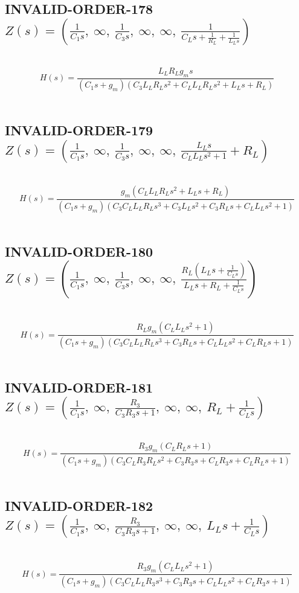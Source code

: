 \documentclass{article}
\begin{document}
\subsection{INVALID-ORDER-178 $Z(s) = \left( \frac{1}{C_{1} s}, \  \infty, \  \frac{1}{C_{3} s}, \  \infty, \  \infty, \  \frac{1}{C_{L} s + \frac{1}{R_{L}} + \frac{1}{L_{L} s}}\right)$ } \ 
\textbf{\[H(s) = \frac{L_{L} R_{L} g_{m} s}{\left(C_{1} s + g_{m}\right) \left(C_{3} L_{L} R_{L} s^{2} + C_{L} L_{L} R_{L} s^{2} + L_{L} s + R_{L}\right)}\] } \ 
\subsection{INVALID-ORDER-179 $Z(s) = \left( \frac{1}{C_{1} s}, \  \infty, \  \frac{1}{C_{3} s}, \  \infty, \  \infty, \  \frac{L_{L} s}{C_{L} L_{L} s^{2} + 1} + R_{L}\right)$ } \ 
\textbf{\[H(s) = \frac{g_{m} \left(C_{L} L_{L} R_{L} s^{2} + L_{L} s + R_{L}\right)}{\left(C_{1} s + g_{m}\right) \left(C_{3} C_{L} L_{L} R_{L} s^{3} + C_{3} L_{L} s^{2} + C_{3} R_{L} s + C_{L} L_{L} s^{2} + 1\right)}\] } \ 
\subsection{INVALID-ORDER-180 $Z(s) = \left( \frac{1}{C_{1} s}, \  \infty, \  \frac{1}{C_{3} s}, \  \infty, \  \infty, \  \frac{R_{L} \left(L_{L} s + \frac{1}{C_{L} s}\right)}{L_{L} s + R_{L} + \frac{1}{C_{L} s}}\right)$ } \ 
\textbf{\[H(s) = \frac{R_{L} g_{m} \left(C_{L} L_{L} s^{2} + 1\right)}{\left(C_{1} s + g_{m}\right) \left(C_{3} C_{L} L_{L} R_{L} s^{3} + C_{3} R_{L} s + C_{L} L_{L} s^{2} + C_{L} R_{L} s + 1\right)}\] } \ 
\subsection{INVALID-ORDER-181 $Z(s) = \left( \frac{1}{C_{1} s}, \  \infty, \  \frac{R_{3}}{C_{3} R_{3} s + 1}, \  \infty, \  \infty, \  R_{L} + \frac{1}{C_{L} s}\right)$ } \ 
\textbf{\[H(s) = \frac{R_{3} g_{m} \left(C_{L} R_{L} s + 1\right)}{\left(C_{1} s + g_{m}\right) \left(C_{3} C_{L} R_{3} R_{L} s^{2} + C_{3} R_{3} s + C_{L} R_{3} s + C_{L} R_{L} s + 1\right)}\] } \ 
\subsection{INVALID-ORDER-182 $Z(s) = \left( \frac{1}{C_{1} s}, \  \infty, \  \frac{R_{3}}{C_{3} R_{3} s + 1}, \  \infty, \  \infty, \  L_{L} s + \frac{1}{C_{L} s}\right)$ } \ 
\textbf{\[H(s) = \frac{R_{3} g_{m} \left(C_{L} L_{L} s^{2} + 1\right)}{\left(C_{1} s + g_{m}\right) \left(C_{3} C_{L} L_{L} R_{3} s^{3} + C_{3} R_{3} s + C_{L} L_{L} s^{2} + C_{L} R_{3} s + 1\right)}\] } \ 
\end{document}
